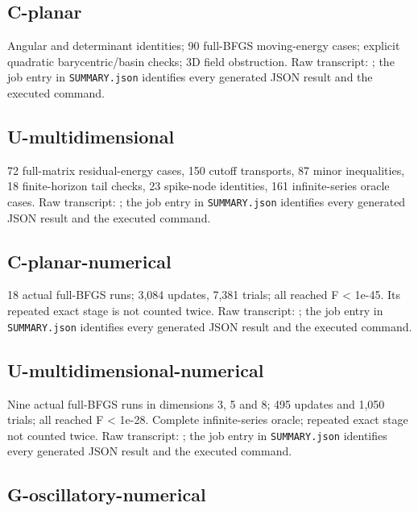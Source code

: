 \documentclass[10pt,oneside,openany]{book}
\theoremstyle{remark}\newtheorem{remark}{Remark}[chapter]
\begin{document}
\subsection{C-planar}\label{c-planar}

Angular and determinant identities; 90 full-BFGS moving-energy cases; explicit quadratic barycentric/basin checks; 3D field obstruction. Raw transcript: ; the job entry in \texttt{SUMMARY.json} identifies every generated JSON result and the executed command.

\subsection{U-multidimensional}\label{u-multidimensional}

72 full-matrix residual-energy cases, 150 cutoff transports, 87 minor inequalities, 18 finite-horizon tail checks, 23 spike-node identities, 161 infinite-series oracle cases. Raw transcript: ; the job entry in \texttt{SUMMARY.json} identifies every generated JSON result and the executed command.

\subsection{C-planar-numerical}\label{c-planar-numerical}

18 actual full-BFGS runs; 3,084 updates, 7,381 trials; all reached F \textless{} 1e-45. Its repeated exact stage is not counted twice. Raw transcript: ; the job entry in \texttt{SUMMARY.json} identifies every generated JSON result and the executed command.

\subsection{U-multidimensional-numerical}\label{u-multidimensional-numerical}

Nine actual full-BFGS runs in dimensions 3, 5 and 8; 495 updates and 1,050 trials; all reached F \textless{} 1e-28. Complete infinite-series oracle; repeated exact stage not counted twice. Raw transcript: ; the job entry in \texttt{SUMMARY.json} identifies every generated JSON result and the executed command.

\subsection{G-oscillatory-numerical}\label{g-oscillatory-numerical}
\end{document}

